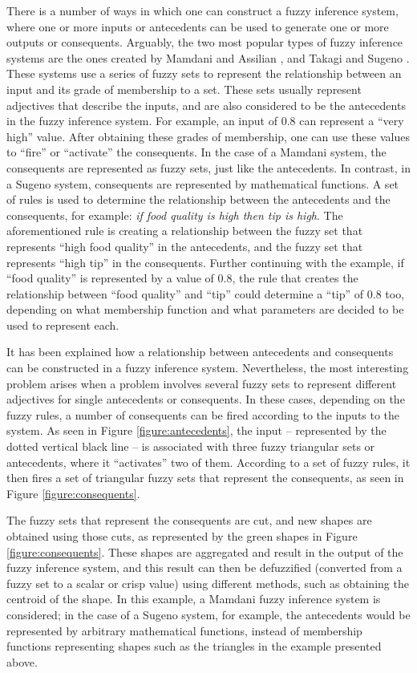 There is a number of ways in which one can construct a fuzzy inference system,
where one or more inputs or antecedents can be used to generate one or more
outputs or consequents. Arguably, the two most popular types of fuzzy inference
systems are the ones created by Mamdani and Assilian \cite{Mamdani1975}, and
Takagi and Sugeno \cite{Takagi1985}. These systems use a series of fuzzy sets to
represent the relationship between an input and its grade of membership to a
set. These sets usually represent adjectives that describe the inputs, and are
also considered to be the antecedents in the fuzzy inference system. For
example, an input of 0.8 can represent a ``very high'' value. After obtaining
these grades of membership, one can use these values to ``fire'' or ``activate'' the
consequents. In the case of a Mamdani system, the consequents are represented as
fuzzy sets, just like the antecedents. In contrast, in a Sugeno system,
consequents are represented by mathematical functions. A set of rules is used to
determine the relationship between the antecedents and the consequents, for
example: \textit{if food quality is high then tip is high}. The aforementioned
rule is creating a relationship between the fuzzy set that represents ``high food
quality'' in the antecedents, and the fuzzy set that represents ``high tip'' in the
consequents. Further continuing with the example, if ``food quality'' is
represented by a value of 0.8, the rule that creates the relationship between
``food quality'' and ``tip'' could determine a ``tip'' of 0.8 too, depending on what
membership function and what parameters are decided to be used to represent
each.

It has been explained how a relationship between antecedents and consequents can
be constructed in a fuzzy inference system. Nevertheless, the most interesting
problem arises when a problem involves several fuzzy sets to represent different
adjectives for single antecedents or consequents. In these cases, depending on
the fuzzy rules, a number of consequents can be fired according to the inputs to
the system. As seen in Figure \ref{figure:antecedents}, the input -- represented
by the dotted vertical black line -- is associated with three fuzzy triangular
sets or antecedents, where it ``activates'' two of them. According to a set of
fuzzy rules, it then fires a set of triangular fuzzy sets that represent the
consequents, as seen in Figure \ref{figure:consequents}.

The fuzzy sets that represent the consequents are cut, and new shapes are
obtained using those cuts, as represented by the green shapes in Figure
\ref{figure:consequents}. These shapes are aggregated and result in the output
of the fuzzy inference system, and this result can then be defuzzified
(converted from a fuzzy set to a scalar or crisp value) using different methods,
such as obtaining the centroid of the shape. In this example, a Mamdani fuzzy
inference system is considered; in the case of a Sugeno system, for example, the
antecedents would be represented by arbitrary mathematical functions, instead of
membership functions representing shapes such as the triangles in the example
presented above.

